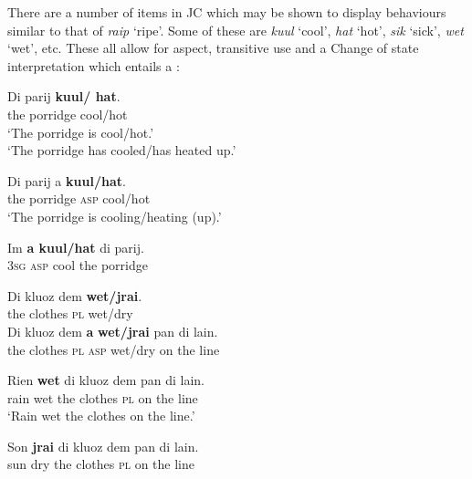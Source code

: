 There are a number of items in JC which may be shown to display behaviours similar to that of \textit{raip} `ripe'. Some of these are \textit{kuul} `cool', \textit{hat} `hot', \textit{sik} `sick', \textit{wet} `wet', etc. These all allow for  aspect, transitive use and a Change of state interpretation which entails a :\largerpage

\ea%
 \label{ex:5:9}
\ea 
\gll Di parij \textbf{{kuul/ hat}}.\\
 the porridge cool/hot\\
\ea `{{The porridge is cool\slash hot.'}}\\
\ex `{The porridge has cooled\slash has heated up}.' \\
\z

\ex 
\gll Di parij a \textbf{{kuul/hat}}.\\
 the porridge \textsc{asp} cool/hot\\
\glt `{The porridge is cooling\slash heating (up).'}

\ex 
\gll Im \textbf{{a kuul/hat}} di parij. \\
 \textsc{3sg} \textsc{asp} cool the porridge\\
 \z
\z

\ea
\label{ex:5:10}
\ea 
\gll Di kluoz dem \textbf{wet/jrai}.\\
 the clothes {\textsc{pl}} wet/dry\\
\z
\ex 
\gll Di kluoz dem \textbf{a} \textbf{wet/jrai} pan di lain.\\
 the clothes {\textsc{pl}} \textsc{asp} wet/dry on the line\\

\ex 
\gll Rien \textbf{wet} di kluoz dem pan di lain.\\
 rain wet the clothes \textsc{pl} on the line\\
\glt `{Rain wet the clothes on the line}.'

\ex 
\gll Son \textbf{jrai} di kluoz dem pan di lain.\\
 sun dry the clothes \textsc{pl} on the line\\
\z
\z


\ea%
\label{ex:5:11}

